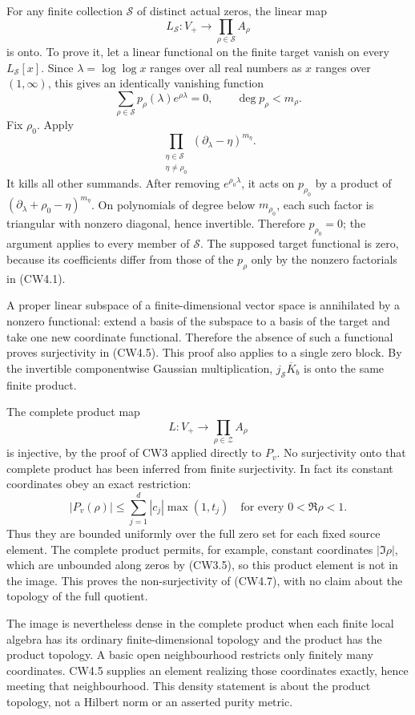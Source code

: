For any finite collection \(\mathcal S\) of distinct actual zeros, the
linear map \[
L_{\mathcal S}:V_+\longrightarrow\prod_{\rho\in\mathcal S}A_\rho
\tag{CW4.5}
\] is onto. To prove it, let a linear functional on the finite target
vanish on every \(L_{\mathcal S}[x]\). Since \(\lambda=\log\log x\)
ranges over all real numbers as \(x\) ranges over \((1,\infty)\), this
gives an identically vanishing function \[
\sum_{\rho\in\mathcal S}p_\rho(\lambda)e^{\rho\lambda}=0,
\qquad \deg p_\rho<m_\rho.
\tag{CW4.6}
\] Fix \(\rho_0\). Apply \[
\prod_{\substack{\eta\in\mathcal S\\\eta\ne\rho_0}}
(\partial_\lambda-\eta)^{m_\eta}.
\] It kills all other summands. After removing \(e^{\rho_0\lambda}\), it
acts on \(p_{\rho_0}\) by a product of
\((\partial_\lambda+\rho_0-\eta)^{m_\eta}\). On polynomials of degree
below \(m_{\rho_0}\), each such factor is triangular with nonzero
diagonal, hence invertible. Therefore \(p_{\rho_0}=0\); the argument
applies to every member of \(\mathcal S\). The supposed target
functional is zero, because its coefficients differ from those of the
\(p_\rho\) only by the nonzero factorials in (CW4.1).

A proper linear subspace of a finite-dimensional vector space is
annihilated by a nonzero functional: extend a basis of the subspace to a
basis of the target and take one new coordinate functional. Therefore
the absence of such a functional proves surjectivity in (CW4.5). This
proof also applies to a single zero block. By the invertible
componentwise Gaussian multiplication, \(j_{\mathcal S}\overline K_b\)
is onto the same finite product.

The complete product map \[
L:V_+\longrightarrow\prod_{\rho\in\mathcal Z}A_\rho
\tag{CW4.7}
\] is injective, by the proof of CW3 applied directly to \(P_v\). No
surjectivity onto that complete product has been inferred from finite
surjectivity. In fact its constant coordinates obey an exact
restriction: \[
|P_v(\rho)|\le\sum_{j=1}^d|c_j|\max(1,t_j)
\quad\text{for every }0<\Re\rho<1.
\tag{CW4.8}
\] Thus they are bounded uniformly over the full zero set for each fixed
source element. The complete product permits, for example, constant
coordinates \(|\Im\rho|\), which are unbounded along zeros by (CW3.5),
so this product element is not in the image. This proves the
non-surjectivity of (CW4.7), with no claim about the topology of the
full quotient.

The image is nevertheless dense in the complete product when each finite
local algebra has its ordinary finite-dimensional topology and the
product has the product topology. A basic open neighbourhood restricts
only finitely many coordinates. CW4.5 supplies an element realizing
those coordinates exactly, hence meeting that neighbourhood. This
density statement is about the product topology, not a Hilbert norm or
an asserted purity metric.

